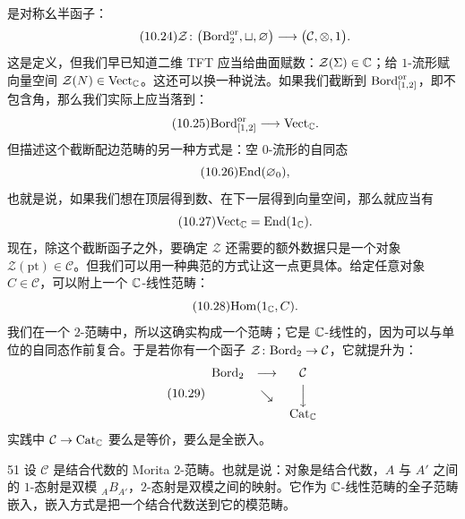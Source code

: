 是对称幺半函子：
\begin{equation}\tag{10.24}
\mathcal{Z}\colon\big(\mathrm{Bord}_2^{\mathrm{or}},\sqcup,\varnothing\big)\longrightarrow\big(\mathcal{C},\otimes,1\big).
\end{equation}
这是定义，但我们早已知道二维 TFT 应当给曲面赋数：$\mathcal{Z}(\Sigma)\in\mathbb{C}$；给 $1$-流形赋向量空间 $\mathcal{Z}(N)\in\mathrm{Vect}_{\mathbb{C}}$。这还可以换一种说法。如果我们截断到 $\mathrm{Bord}_{[1,2]}^{\mathrm{or}}$，即不包含角，那么我们实际上应当落到：
\begin{equation}\tag{10.25}
\mathrm{Bord}_{[1,2]}^{\mathrm{or}}\longrightarrow \mathrm{Vect}_{\mathbb{C}}.
\end{equation}
但描述这个截断配边范畴的另一种方式是：空 $0$-流形的自同态
\begin{equation}\tag{10.26}
\mathrm{End}(\varnothing_0),
\end{equation}
也就是说，如果我们想在顶层得到数、在下一层得到向量空间，那么就应当有
\begin{equation}\tag{10.27}
\mathrm{Vect}_{\mathbb{C}}=\mathrm{End}(1_{\mathbb{C}}).
\end{equation}
现在，除这个截断函子之外，要确定 $\mathcal{Z}$ 还需要的额外数据只是一个对象 $\mathcal{Z}(\mathrm{pt})\in\mathcal{C}$。但我们可以用一种典范的方式让这一点更具体。给定任意对象 $C\in\mathcal{C}$，可以附上一个 $\mathbb{C}$-线性范畴：
\begin{equation}\tag{10.28}
\mathrm{Hom}(1_{\mathbb{C}},C).
\end{equation}
我们在一个 $2$-范畴中，所以这确实构成一个范畴；它是 $\mathbb{C}$-线性的，因为可以与单位的自同态作前复合。于是若你有一个函子 $\mathcal{Z}\colon\mathrm{Bord}_2\to\mathcal{C}$，它就提升为：
\begin{equation}\tag{10.29}
\begin{array}{ccc}
\mathrm{Bord}_2 & \longrightarrow & \mathcal{C}\\[3pt]
& \searrow & \Big\downarrow\\[3pt]
& & \mathrm{Cat}_{\mathbb{C}}
\end{array}
\end{equation}
实践中 $\mathcal{C}\to\mathrm{Cat}_{\mathbb{C}}$ 要么是等价，要么是全嵌入。

\begin{srcex}{51}
设 $\mathcal{C}$ 是结合代数的 Morita $2$-范畴。也就是说：对象是结合代数，$A$ 与 $A'$ 之间的 $1$-态射是双模 ${}_A B_{A'}$，$2$-态射是双模之间的映射。它作为 $\mathbb{C}$-线性范畴的全子范畴嵌入，嵌入方式是把一个结合代数送到它的模范畴。
\end{srcex}


